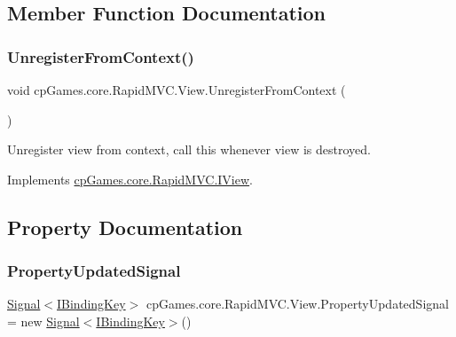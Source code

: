 \subsection{Member Function Documentation}
\mbox{\label{classcp_games_1_1core_1_1_rapid_m_v_c_1_1_view_a4b7e26a0ea011dac7cf83be10645db4d}} 
\subsubsection{\texorpdfstring{UnregisterFromContext()}{UnregisterFromContext()}}
{\footnotesize\ttfamily void cp\+Games.\+core.\+Rapid\+M\+V\+C.\+View.\+Unregister\+From\+Context (\begin{DoxyParamCaption}{ }\end{DoxyParamCaption})}



Unregister view from context, call this whenever view is destroyed. 



Implements \mbox{\hyperlink{interfacecp_games_1_1core_1_1_rapid_m_v_c_1_1_i_view_a2d09577e2b5475273d73484a8d3ff36d}{cp\+Games.\+core.\+Rapid\+M\+V\+C.\+I\+View}}.



\subsection{Property Documentation}
\mbox{\label{classcp_games_1_1core_1_1_rapid_m_v_c_1_1_view_ab8e01d990df4516ff4591df6277edf63}} 
\subsubsection{\texorpdfstring{PropertyUpdatedSignal}{PropertyUpdatedSignal}}
{\footnotesize\ttfamily \mbox{\hyperlink{classcp_games_1_1core_1_1_rapid_m_v_c_1_1_signal}{Signal}}$<$\mbox{\hyperlink{interfacecp_games_1_1core_1_1_rapid_m_v_c_1_1_i_binding_key}{I\+Binding\+Key}}$>$ cp\+Games.\+core.\+Rapid\+M\+V\+C.\+View.\+Property\+Updated\+Signal = new \mbox{\hyperlink{classcp_games_1_1core_1_1_rapid_m_v_c_1_1_signal}{Signal}}$<$\mbox{\hyperlink{interfacecp_games_1_1core_1_1_rapid_m_v_c_1_1_i_binding_key}{I\+Binding\+Key}}$>$()\hspace{0.3cm}{\ttfamily [get]}}

